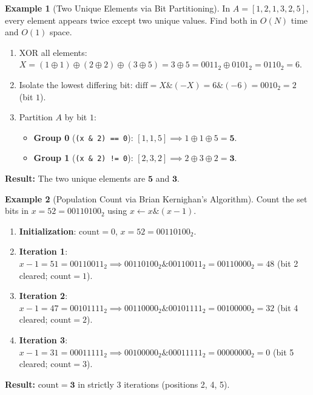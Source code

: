\documentclass[11pt,a4paper]{article}
\theoremstyle{definition}
\newtheorem{example}{Example}[section]
\begin{document}
\begin{example}[Two Unique Elements via Bit Partitioning]
In $A = [1, 2, 1, 3, 2, 5]$, every element appears twice except two unique values. Find both in $O(N)$ time and $O(1)$ space.
\begin{enumerate}[itemsep=2pt]
    \item XOR all elements: $X = (1 \oplus 1) \oplus (2 \oplus 2) \oplus (3 \oplus 5) = 3 \oplus 5 = 0011_2 \oplus 0101_2 = 0110_2 = 6$.
    \item Isolate the lowest differing bit: $\text{diff} = X \mathbin{\&} (-X) = 6 \mathbin{\&} (-6) = 0010_2 = 2$ (bit $1$).
    \item Partition $A$ by bit $1$:
    \begin{itemize}[itemsep=1pt, topsep=1pt]
        \item \textbf{Group 0} (\texttt{(x \& 2) == 0}): $[1, 1, 5] \implies 1 \oplus 1 \oplus 5 = \mathbf{5}$.
        \item \textbf{Group 1} (\texttt{(x \& 2) != 0}): $[2, 3, 2] \implies 2 \oplus 3 \oplus 2 = \mathbf{3}$.
    \end{itemize}
\end{enumerate}
\textbf{Result:} The two unique elements are $\mathbf{5}$ and $\mathbf{3}$.
\end{example}

\begin{example}[Population Count via Brian Kernighan's Algorithm]
Count the set bits in $x = 52 = 00110100_2$ using $x \leftarrow x \mathbin{\&} (x - 1)$.
\begin{enumerate}[itemsep=2pt]
    \item \textbf{Initialization}: $\text{count} = 0$, $x = 52 = 00110100_2$.
    \item \textbf{Iteration 1}: $x - 1 = 51 = 00110011_2 \implies 00110100_2 \mathbin{\&} 00110011_2 = 00110000_2 = 48$ (bit 2 cleared; $\text{count} = 1$).
    \item \textbf{Iteration 2}: $x - 1 = 47 = 00101111_2 \implies 00110000_2 \mathbin{\&} 00101111_2 = 00100000_2 = 32$ (bit 4 cleared; $\text{count} = 2$).
    \item \textbf{Iteration 3}: $x - 1 = 31 = 00011111_2 \implies 00100000_2 \mathbin{\&} 00011111_2 = 00000000_2 = 0$ (bit 5 cleared; $\text{count} = 3$).
\end{enumerate}
\textbf{Result:} $\text{count} = \mathbf{3}$ in strictly $3$ iterations (positions 2, 4, 5).
\end{example}
\end{document}
